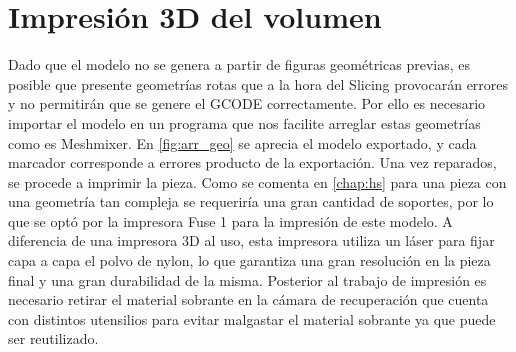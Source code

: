 \section{Impresión 3D del volumen}
 Dado que el modelo no se genera a partir de figuras geométricas previas, es posible que presente geometrías rotas que a la hora del Slicing provocarán errores y no permitirán que se genere el GCODE correctamente.
 Por ello es necesario importar el modelo en un programa que nos facilite arreglar estas geometrías como es Meshmixer. En \ref{fig:arr_geo} se aprecia el modelo exportado, y cada marcador corresponde a errores producto de la exportación. Una vez reparados, se procede a imprimir la pieza.
 Como se comenta en \ref{chap:hs} para una pieza con una geometría tan compleja se requeriría una gran cantidad de soportes, por lo que se optó por la impresora Fuse 1 para la impresión de este modelo. A diferencia de una impresora 3D al uso, esta impresora utiliza un láser para fijar capa a capa el polvo de nylon, lo que garantiza una gran resolución en la pieza final y una gran durabilidad de la misma. Posterior al  trabajo de impresión es necesario retirar el material sobrante en la cámara de recuperación que cuenta con distintos utensilios para evitar malgastar el material sobrante ya que puede ser reutilizado.

